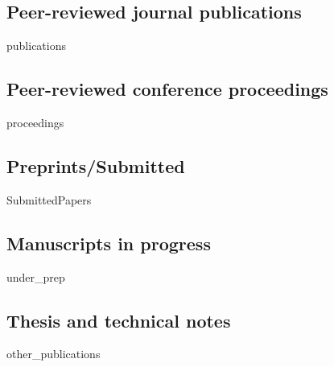 \documentclass[11pt,a4paper,sans]{moderncv}        %
\begin{document}
\subsection{\textbf{Peer-reviewed journal publications}}

\begin{btSect}{publications}
\btPrintAll
\end{btSect}

\subsection{\textbf{Peer-reviewed conference proceedings}}
\begin{btSect}[unsrt]{proceedings}
\btPrintAll
\end{btSect}


\subsection{\textbf{Preprints/Submitted}}
\begin{btSect}[unsrt]{SubmittedPapers}
\btPrintAll
\end{btSect}

\subsection{\textbf{Manuscripts in progress}}
\begin{btSect}[unsrt]{under_prep}
\btPrintAll
\end{btSect}

\subsection{\textbf{Thesis and technical notes}}
\begin{btSect}[unsrt]{other_publications}
	\btPrintAll
\end{btSect}


\end{document}
